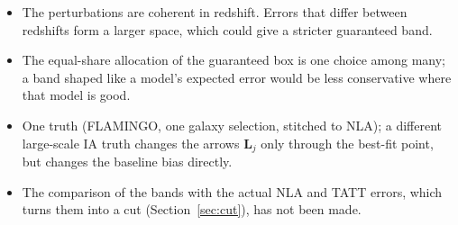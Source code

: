 \documentclass[11pt]{article}
\newcommand{\bvec}[1]{\boldsymbol{#1}}
\begin{document}
\begin{itemize}
  \item The perturbations are coherent in redshift. Errors that differ
    between redshifts form a larger space, which could give a stricter
    guaranteed band.
  \item The equal-share allocation of the guaranteed box is one choice
    among many; a band shaped like a model's expected error would be less
    conservative where that model is good.
  \item One truth (FLAMINGO, one galaxy selection, stitched to NLA); a
    different large-scale IA truth changes the arrows $\bvec L_j$ only
    through the best-fit point, but changes the baseline bias directly.
  \item The comparison of the bands with the actual NLA and TATT errors,
    which turns them into a cut (Section~\ref{sec:cut}), has not been made.
\end{itemize}
\end{document}

